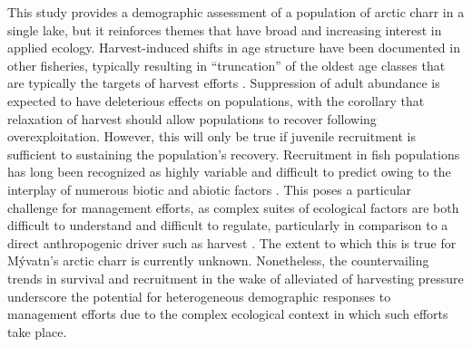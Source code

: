 This study provides a demographic assessment of a population of arctic charr in a single lake,
but it reinforces themes that have broad and increasing interest in applied ecology.
Harvest-induced shifts in age structure have been documented in other fisheries,
typically resulting in ``truncation'' of the oldest age classes 
that are typically the targets of harvest efforts
\citep{hsieh2010fishing}.
Suppression of adult abundance is expected to have deleterious effects on populations,
with the corollary that relaxation of harvest should allow populations 
to recover following overexploitation.
However, this will only be true if juvenile recruitment is sufficient 
to sustaining the population's recovery.
Recruitment in fish populations 
has long been recognized as highly variable and difficult to predict
owing to the interplay of numerous biotic and abiotic factors 
\citep{dixon1999episodic, houde2008emerging, ludsin2014physical}.
This poses a particular challenge for management efforts, 
as complex suites of ecological factors are both difficult to understand 
and difficult to regulate, 
particularly in comparison to a direct anthropogenic driver such as harvest
\citep{beamish1999taking, link2002does}.
The extent to which this is true for M\'{y}vatn's arctic charr is currently unknown.
Nonetheless, 
the countervailing trends in survival and recruitment 
in the wake of alleviated of harvesting pressure
underscore the potential for heterogeneous demographic responses to management efforts
due to the complex ecological context in which such efforts take place.

